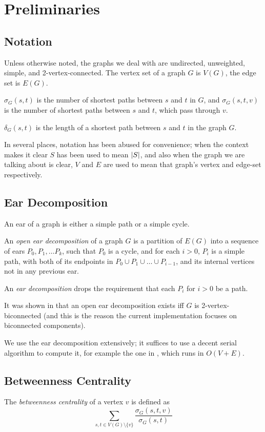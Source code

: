 \section{Preliminaries}
\label{prelim}

\subsection{Notation}
Unless otherwise noted, the graphs we deal with are undirected, unweighted,
simple, and 2-vertex-connected.
The vertex set of a graph $G$ is $V(G)$, the edge set is $E(G)$.

$\sigma_G(s, t)$ is the number of shortest paths between $s$ and $t$ in $G$,
and $\sigma_G(s, t, v)$ is the number of shortest paths between $s$ and $t$,
which pass through $v$.

$\delta_G(s, t)$ is the length of a shortest path between $s$ and $t$
in the graph $G$.

In several places, notation has been abused for convenience;
when the context makes it clear $S$ has been used to mean $\card{S}$,
and also when the graph we are talking about is clear, $V$ and $E$ are
used to mean that graph's vertex and edge-set respectively.

\subsection{Ear Decomposition}
An ear of a graph is either a simple path or a simple cycle.

An \emph{open ear decomposition} of a graph $G$ is a partition of $E(G)$ into
a sequence of ears $P_0, P_1, \dots P_k$, such that
$P_0$ is a cycle, and for each $i > 0$, $P_i$ is a simple path,
with both of its endpoints in $P_0 \cup P_1 \cup\dots\cup P_{i - 1}$, and
its internal vertices not in any previous ear.

An \emph{ear decomposition} drops the requirement that each $P_i$ for $i > 0$
be a path.

It was shown in \cite{whitney32} that an open ear decomposition exists iff
$G$ is 2-vertex-biconnected (and this is the reason the current implementation
focuses on biconnected components).

We use the ear decomposition extensively;
it suffices to use a decent serial algorithm to compute it, for example the
one in \cite{schmidt13}, which runs in $O(V + E)$.

\subsection{Betweenness Centrality}
The \emph{betweenness centrality} of a vertex $v$ is defined as
\[ \sum_{s, t \in V(G)\setminus \{v\}}
	\frac{\sigma_G(s, t, v)}{\sigma_G(s, t)} \]

